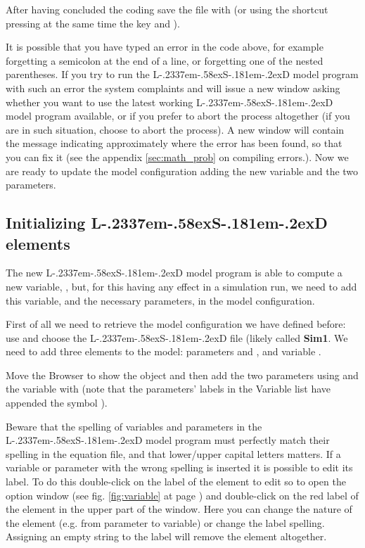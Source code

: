 \documentclass [11pt,a4paper] {book}
\def\LsD{{L\kern-.2337em\lower-.58ex\hbox{S}\kern-.181em\lower-.2ex\hbox{D}}\xspace}
\begin{document}
After having concluded the coding save the file with  (or using the
shortcut pressing at the same time the key  and ).

It is possible that you have typed an error in the code above, for example forgetting a
semicolon at the end of a line, or forgetting one of the nested parentheses. If you try
to run the \LsD model program with such an error the system complaints and will issue a
new window asking whether you want to use the latest working \LsD model program available,
or if you prefer to abort the process altogether (if you are in such situation, choose
 to abort the process). A new window will contain the message indicating
approximately where the error has been found, so that you can fix it (see the appendix
\ref{sec:math_prob} on compiling errors.). Now we are ready to update the model
configuration adding the new variable and the two parameters.

\subsection{Initializing \LsD elements}

The new \LsD model program is able to compute a new variable,
, but, for this having any effect in a simulation run, we need to add this variable, and the necessary parameters, in the model configuration.

First of all we need to retrieve the model configuration we have defined before: use
 and choose the \LsD file (likely called \textbf{Sim1}. We need to add three elements to the model: parameters  and , and
variable . 

Move the Browser to show the  object
and then add the two parameters using  and the variable
with  (note that the parameters' labels in the Variable list
have appended the symbol ).

Beware that the spelling of variables and parameters in the \LsD model program must
perfectly match their spelling in the equation file, and that lower/upper capital letters
matters. If a variable or parameter with the wrong spelling is inserted it is possible to
edit its label. To do this double-click on the label of the element to edit so to open
the option window (see fig. \ref{fig:variable} at page \pageref{fig:variable}) and
double-click on the red label of the element in the upper part of the window. Here you can
change the nature of the element (e.g. from parameter to variable) or change the label
spelling. Assigning an empty string to the label will remove the element altogether.
\end{document}
